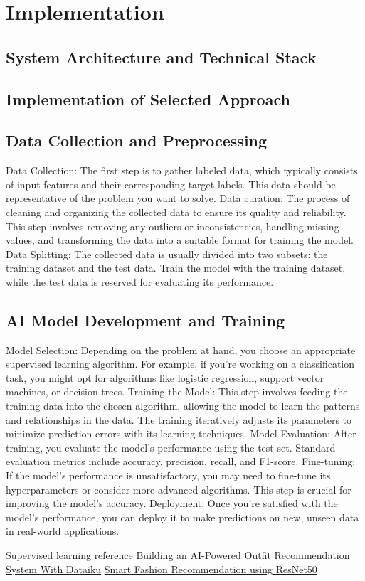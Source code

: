 \chapter{Implementation}
\section{System Architecture and Technical Stack}
\section{Implementation of Selected Approach}
\section{Data Collection and Preprocessing}


Data Collection: The first step is to gather labeled data, which typically consists of input features and their corresponding target labels. This data should be representative of the problem you want to solve.
Data curation: The process of cleaning and organizing the collected data to ensure its quality and reliability. This step involves removing any outliers or inconsistencies, handling missing values, and transforming the data into a suitable format for training the model.
Data Splitting: The collected data is usually divided into two subsets: the training dataset and the test data. Train the model with the training dataset, while the test data is reserved for evaluating its performance.

\section{AI Model Development and Training}

Model Selection: Depending on the problem at hand, you choose an appropriate supervised learning algorithm. For example, if you're working on a classification task, you might opt for algorithms like logistic regression, support vector machines, or decision trees.
Training the Model: This step involves feeding the training data into the chosen algorithm, allowing the model to learn the patterns and relationships in the data. The training iteratively adjusts its parameters to minimize prediction errors with its learning techniques.
Model Evaluation: After training, you evaluate the model's performance using the test set. Standard evaluation metrics include accuracy, precision, recall, and F1-score.
Fine-tuning: If the model's performance is unsatisfactory, you may need to fine-tune its hyperparameters or consider more advanced algorithms. This step is crucial for improving the model's accuracy.
Deployment: Once you're satisfied with the model's performance, you can deploy it to make predictions on new, unseen data in real-world applications.


\href{https://encord.com/blog/mastering-supervised-learning-a-comprehensive-guide/}{Supervised learning reference}
\href{https://blog.dataiku.com/outfit-recommendation-system}{Building an AI-Powered Outfit Recommendation System With Dataiku}
\href{https://nisargdoshi.medium.com/smart-fashion-recommendation-using-resnet50-b21d47cc91b1}{Smart Fashion Recommendation using ResNet50}